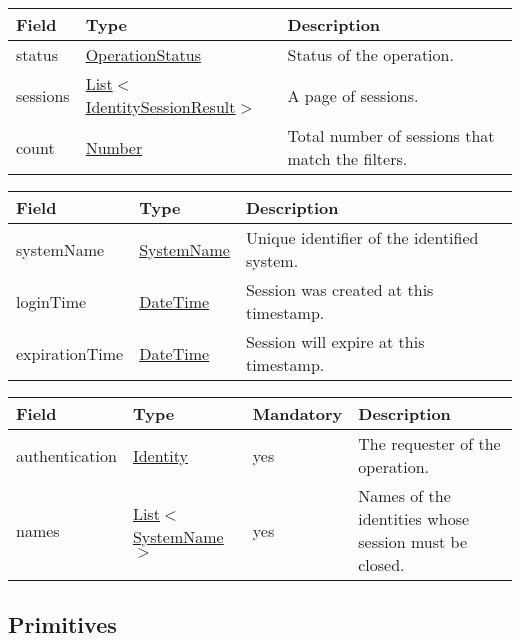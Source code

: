 \documentclass[a4paper]{arrowhead}
\newcommand{\pref}[1]{{\textcolor{ArrowheadGrey}{\hyperref[sec:model:primitives:#1]{#1}}}}
\begin{document}

\begin{table}[ht!]
\begin{tabularx}{\textwidth}{| p{2.5cm} | p{4.5cm} | X |} \hline
\rowcolor{gray!33} Field & Type      & Description \\ \hline
status & \pref{OperationStatus} & Status of the operation. \\ \hline
sessions & \pref{List}$<$\hyperref[sec:model:IdentitySessionResult]{IdentitySessionResult}$>$ & A page of sessions. \\ \hline
count & \pref{Number} & Total number of sessions that match the filters. \\ \hline
\end{tabularx}
\end{table}

 
\begin{table}[ht!]
\begin{tabularx}{\textwidth}{| p{3.3cm} | p{4cm} | X |} \hline
\rowcolor{gray!33} Field & Type      & Description \\ \hline
systemName & \pref{SystemName} & Unique identifier of the identified system. \\ \hline
loginTime & \pref{DateTime} & Session was created at this timestamp. \\ \hline
expirationTime & \pref{DateTime} & Session will expire at this timestamp. \\ \hline
\end{tabularx}
\end{table}


\begin{table}[ht!]
\begin{tabularx}{\textwidth}{| p{2.5cm} | p{2.5cm} | p{2cm} | X |} \hline
\rowcolor{gray!33} Field & Type & Mandatory & Description \\ \hline
authentication & \hyperref[sec:model:Identity]{Identity} & yes & The requester of the operation. \\ \hline
names &  \pref{List}$<$\pref{SystemName}$>$ & yes & Names of the identities whose session must be closed. \\ \hline
\end{tabularx}
\end{table}

\subsection{Primitives}
\label{sec:model:primitives}
\end{document}
